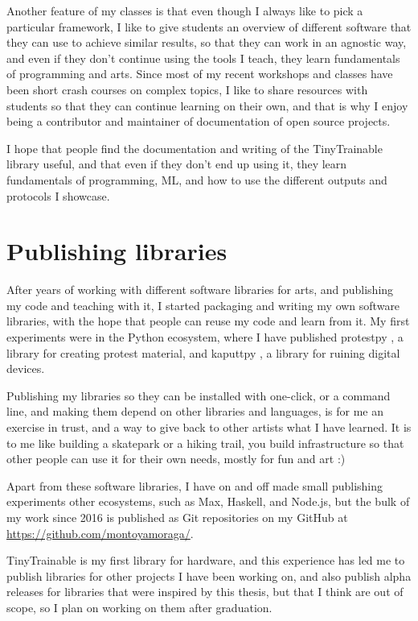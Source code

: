 Another feature of my classes is that even though I always like to pick a particular framework, I like to give students an overview of different software that they can use to achieve similar results, so that they can work in an agnostic way, and even if they don't continue using the tools I teach, they learn fundamentals of programming and arts. Since most of my recent workshops and classes have been short crash courses on complex topics, I like to share resources with students so that they can continue learning on their own, and that is why I enjoy being a contributor and maintainer of documentation of open source projects.

I hope that people find the documentation and writing of the TinyTrainable library useful, and that even if they don't end up using it, they learn fundamentals of programming, \acrshort{ML}, and how to use the different outputs and protocols I showcase.

\section{Publishing libraries}

After years of working with different software libraries for arts, and publishing my code and teaching with it, I started packaging and writing my own software libraries, with the hope that people can reuse my code and learn from it. My first experiments were in the Python ecosystem, where I have published protestpy \cite{website-pypi-protestpy}, a library for creating protest material, and kaputtpy \cite{website-pypi-kaputtpy}, a library for ruining digital devices.

Publishing my libraries so they can be installed with one-click, or a command line, and making them depend on other libraries and languages, is for me an exercise in trust, and a way to give back to other artists what I have learned. It is to me like building a skatepark or a hiking trail, you build infrastructure so that other people can use it for their own needs, mostly for fun and art :)

Apart from these software libraries, I have on and off made small publishing experiments other ecosystems, such as Max, Haskell, and Node.js, but the bulk of my work since 2016 is published as Git repositories on my GitHub at \url{https://github.com/montoyamoraga/}.



TinyTrainable is my first library for hardware, and this experience has led me to publish libraries for other projects I have been working on, and also publish alpha releases for libraries that were inspired by this thesis, but that I think are out of scope, so I plan on working on them after graduation.

